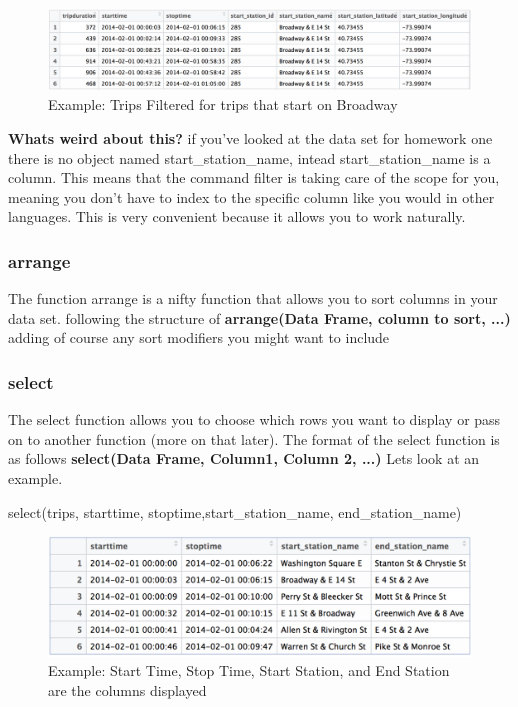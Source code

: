 \begin{figure}[h]
    \centering
    \includegraphics[width=.75\textwidth]{figures/filter_trips_ex.png}
    \caption{Example: Trips Filtered for trips that start on Broadway}
    \label{fig:filter_trips_ex}
\end{figure}

\begin{flushleft}
\textbf{Whats weird about this?} if you've looked at the data set for homework one there is no object named start\_station\_name, intead start\_station\_name is a column. This means that the command filter is taking care of the scope for you, meaning you don't have to index to the specific column like you would in other languages. This is very convenient because it allows you to work naturally.
\end{flushleft}

\subsubsection{arrange}
\begin{flushleft}
The function arrange is a nifty function that allows you to sort columns in your data set. following the structure of \textbf{arrange(Data Frame, column to sort, ...)} adding of course any sort modifiers you might want to include
\end{flushleft}


\subsubsection{select}
\begin{flushleft}
The select function allows you to choose which rows you want to display or pass on to another function (more on that later). The format of the select function is as follows \textbf{select(Data Frame, Column1, Column 2, ...)} Lets look at an example.
\end{flushleft}

\begin{center}
select(trips, starttime, stoptime,start\_station\_name, end\_station\_name)
\end{center}

\begin{figure}[h]
    \centering
    \includegraphics[width=.75\textwidth]{figures/select_trips_ex.PNG}
    \caption{Example: Start Time, Stop Time, Start Station, and End Station are the columns displayed}
    \label{fig:select_trips_ex}
\end{figure}


